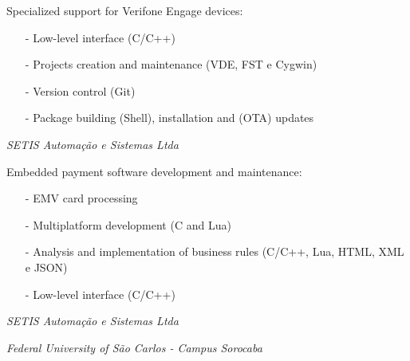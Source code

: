 \documentclass[11pt,a4paper,sans]{moderncv}
\begin{document}

\hspace{1.25cm} \begin{minipage}[htb]{\linewidth - 1.25cm}
    Specialized support for Verifone Engage devices:
    \begin{itemize}
        \item[-] Low-level interface (C/C++)
        \item[-] Projects creation and maintenance (VDE, FST e Cygwin)
        \item[-] Version control (Git)
        \item[-] Package building (Shell), installation and (OTA) updates
    \end{itemize}
\end{minipage}

\vspace{\baselineskip}

\hspace{1.25cm} \textit{SETIS Automação e Sistemas Ltda}


\hspace{1.25cm} \begin{minipage}[htb]{\linewidth - 1.25cm}
    Embedded payment software development and maintenance:
    \begin{itemize}
        \item[-] EMV card processing
        \item[-] Multiplatform development (C and Lua)
        \item[-] Analysis and implementation of business rules (C/C++, Lua,
                 HTML, XML e JSON)
        \item[-] Low-level interface (C/C++)
    \end{itemize}
\end{minipage}

\vspace{\baselineskip}

\hspace{1.25cm} \textit{SETIS Automação e Sistemas Ltda}


\vspace{\baselineskip}

\hspace{1.25cm} \textit{Federal University of São Carlos - Campus Sorocaba}
\end{document}
